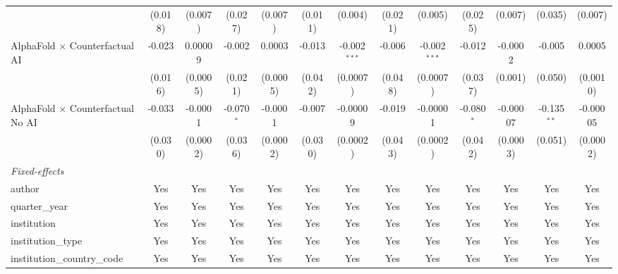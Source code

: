 \begin{tabular}{lcccccccccccc}
                                            & (0.018)       & (0.007)      & (0.027)       & (0.007)      & (0.011)     & (0.004)        & (0.021)     & (0.005)        & (0.025)      & (0.007)       & (0.035)       & (0.007)\\   
   AlphaFold $\times$ Counterfactual AI     & -0.023        & 0.00009      & -0.002        & 0.0003       & -0.013      & -0.002$^{***}$ & -0.006      & -0.002$^{***}$ & -0.012       & -0.0002       & -0.005        & 0.0005\\   
                                            & (0.016)       & (0.0005)     & (0.021)       & (0.0005)     & (0.042)     & (0.0007)       & (0.048)     & (0.0007)       & (0.037)      & (0.001)       & (0.050)       & (0.0010)\\   
   AlphaFold $\times$ Counterfactual No AI  & -0.033        & -0.0001      & -0.070$^{*}$  & -0.0001      & -0.007      & -0.00009       & -0.019      & -0.00001       & -0.080$^{*}$ & -0.00007      & -0.135$^{**}$ & -0.00005\\   
                                            & (0.030)       & (0.0002)     & (0.036)       & (0.0002)     & (0.030)     & (0.0002)       & (0.043)     & (0.0002)       & (0.042)      & (0.0003)      & (0.051)       & (0.0002)\\   
   \midrule
   \emph{Fixed-effects}\\
   author                                   & Yes           & Yes          & Yes           & Yes          & Yes         & Yes            & Yes         & Yes            & Yes          & Yes           & Yes           & Yes\\  
   quarter\_year                            & Yes           & Yes          & Yes           & Yes          & Yes         & Yes            & Yes         & Yes            & Yes          & Yes           & Yes           & Yes\\  
   institution                              & Yes           & Yes          & Yes           & Yes          & Yes         & Yes            & Yes         & Yes            & Yes          & Yes           & Yes           & Yes\\  
   institution\_type                        & Yes           & Yes          & Yes           & Yes          & Yes         & Yes            & Yes         & Yes            & Yes          & Yes           & Yes           & Yes\\  
   institution\_country\_code               & Yes           & Yes          & Yes           & Yes          & Yes         & Yes            & Yes         & Yes            & Yes          & Yes           & Yes           & Yes\\  

\end{tabular}
